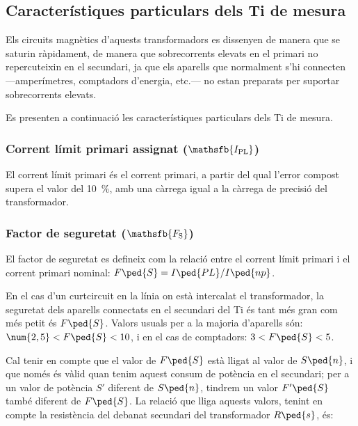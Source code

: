 \subsection{Característiques particulars dels Ti de mesura}

Els circuits magnètics d'aquests transformadors es dissenyen de
manera que se saturin ràpidament, de manera que
sobrecorrents elevats en el primari  no repercuteixin en el secundari,
ja que els aparells que normalment s'hi connecten ---amperímetres,
comptadors d'energia, etc.--- no estan preparats per suportar
sobrecorrents elevats.

Es presenten a continuació les característiques particulars dels Ti
de mesura.

\subsubsection{Corrent límit primari  assignat ($\mathsfb{I_\text{PL}}$)}

El corrent  límit primari
és el corrent primari, a partir del qual l'error compost supera el valor del \qty{10}{\percent}, amb una càrrega igual a la càrrega de
precisió del transformador.

\subsubsection{Factor de seguretat ($\mathsfb{F_\text{S}}$) }

 El factor de seguretat
es defineix com la relació entre el corrent límit primari
i el corrent primari nominal: $F\ped{S} = I\ped{PL} / I\ped{np}$.

En el cas d'un curtcircuit en la línia on està intercalat el
transformador, la seguretat dels aparells connectats en el secundari
del Ti és tant més gran com més petit és  $F\ped{S}$. Valors usuals
per a la majoria d'aparells són:  $\num{2,5}<F\ped{S}<10$, i en el cas de comptadors: $3<F\ped{S}<5$.

Cal tenir en compte que el valor de $F\ped{S}$ està lligat
 al valor de $S\ped{n}$, i que només és vàlid
quan tenim aquest consum de  potència en el secundari; per a un
valor de potència $S'$ diferent de $S\ped{n}$, tindrem un valor
$F'\ped{S}$ també diferent de  $F\ped{S}$. La relació que
lliga aquests valors, tenint en compte la resistència del debanat
secundari del transformador  $R\ped{s}$, és:


